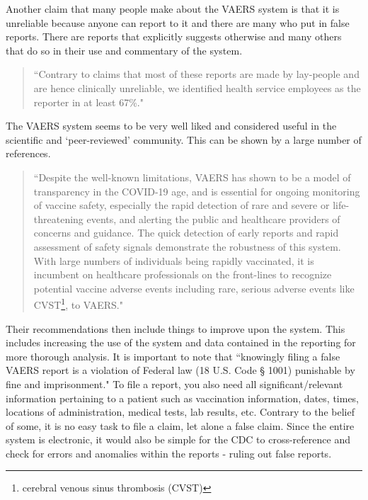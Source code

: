 \documentclass[10pt, a4paper, twocolumn]{book}
\begin{document}
Another claim that many people make about the VAERS system is that it is unreliable because anyone can report to it and there are many who put in false reports. There are reports that explicitly suggests otherwise and many others that do so in their use and commentary of the system.

\begin{quotation}
	``Contrary to claims that most of these reports are made by lay-people and are hence clinically unreliable,	we identified health service employees as the reporter in at least 67\%." \citep{VAERSHealthCareReporters}
\end{quotation} 

The VAERS system seems to be very well liked and considered useful in the scientific and `peer-reviewed' community. This can be shown by a large number of references. 

\begin{quotation}
	``Despite the well-known limitations, VAERS has shown to be a model of transparency in the COVID-19 age, and is essential for ongoing monitoring of vaccine safety, especially the rapid detection of rare and severe or life-threatening events, and alerting the public and healthcare providers of concerns and guidance. The quick detection of early reports and rapid assessment of safety signals demonstrate the robustness of this system. With large numbers of individuals being rapidly vaccinated, it is incumbent
	on healthcare professionals on the front-lines to recognize potential vaccine adverse events including rare, serious adverse events like CVST\footnote{cerebral venous sinus thrombosis (CVST)}, to VAERS." \citep{VAERSReliability}
\end{quotation}

Their recommendations then include things to improve upon the system. This includes increasing the use of the system and data contained in the reporting for more thorough analysis. It is important to note that ``knowingly filing a false VAERS report is a violation of Federal law (18 U.S. Code § 1001) punishable by fine and imprisonment." \cite{VAERS} To file a report, you also need all significant/relevant information pertaining to a patient such as vaccination information, dates, times, locations of administration, medical tests, lab results, etc. Contrary to the belief of some, it is no easy task to file a claim, let alone a false claim. Since the entire system is electronic, it would also be simple for the CDC to cross-reference and check for errors and anomalies within the reports - ruling out false reports.
\end{document}

